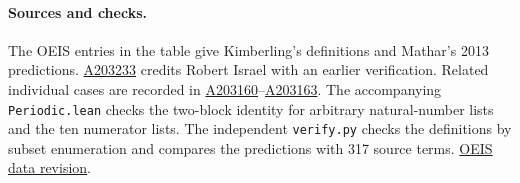 \documentclass[11pt,letterpaper]{article}
\newcommand{\oeis}[1]{\href{https://oeis.org/A#1}{A#1}}
\begin{document}
\paragraph{Sources and checks.}
The OEIS entries in the table give Kimberling's definitions and Mathar's 2013 predictions. \oeis{203233} credits Robert Israel with an earlier verification. Related individual cases are recorded in \oeis{203160}--\oeis{203163}. The accompanying \texttt{Periodic.lean} checks the two-block identity for arbitrary natural-number lists and the ten numerator lists. The independent \texttt{verify.py} checks the definitions by subset enumeration and compares the predictions with 317 source terms. \href{https://github.com/oeis/oeisdata/tree/976b0c73e00453b1c1e6f16d83108cb9bb744c3b}{OEIS data revision}.
\end{document}
